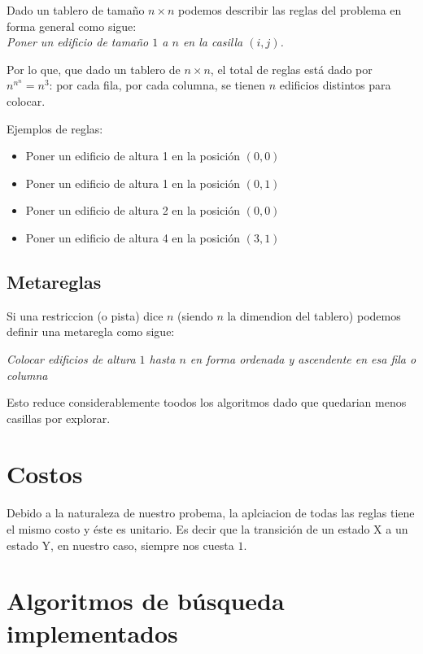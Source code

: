 \documentclass[%
	final,
	reprint,
	notitlepage,
	narroweqnarray,
	inline,
	twoside,
	invited
	]{ieee}
\begin{document}
\par Dado un tablero de tamaño $n\times n$ podemos describir las reglas del problema en forma general como sigue:\\

\emph{Poner un edificio de tamaño $1$ a $n$ en la casilla $(i,j)$.}\\

\par Por lo que, que dado un tablero de $n\times n$, el total de reglas está dado por $n^{n^n} = n^3$: por cada fila, por cada columna, se tienen $n$ edificios distintos para colocar. 
\par Ejemplos de reglas:
\begin{itemize}
\item Poner un edificio de altura 1 en la posición $(0,0)$
\item Poner un edificio de altura 1 en la posición $(0,1)$
\item Poner un edificio de altura 2 en la posición $(0,0)$
\item Poner un edificio de altura 4 en la posición $(3,1)$
\end{itemize}

\subsection{Metareglas}

\par Si una restriccion (o pista) dice $n$ (siendo $n$ la dimendion del tablero) podemos definir una metaregla como sigue:

\emph{Colocar edificios de altura $1$ hasta $n$ en forma ordenada y ascendente en esa fila o columna}

\par Esto reduce considerablemente toodos los algoritmos dado que quedarian menos casillas por explorar.

\section{Costos}

\par Debido a la naturaleza de nuestro probema, la aplciacion de todas las reglas tiene el mismo costo y éste es unitario. Es decir que la transición de un estado X a un estado Y, en nuestro caso, siempre nos cuesta $1$.

\section{Algoritmos de búsqueda implementados}
\end{document}
